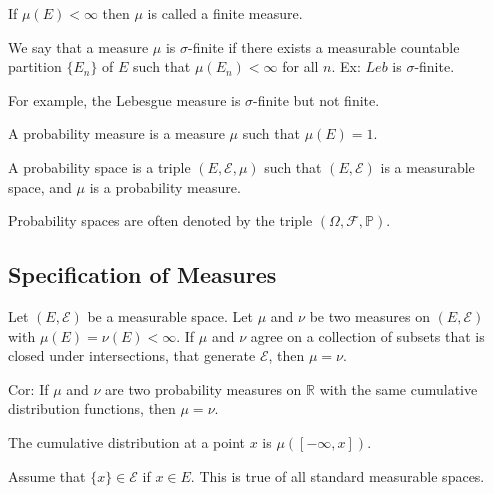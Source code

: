 \documentclass[12pt, titlepage]{article}
\begin{document}
\begin{dfn}{}
	If $\mu(E) < \infty$ then $\mu$ is called a finite measure.
\end{dfn}

\begin{dfn}{}
We say that a measure $\mu$ is $\sigma$-finite if there exists a measurable countable partition $\{E_n\}$ of $E$ such that $\mu(E_n) < \infty$ for all $n$. Ex: $Leb$ is $\sigma$-finite.
\end{dfn}

For example, the Lebesgue measure is $\sigma$-finite but not finite.

\begin{dfn}{}
	A probability measure is a measure $\mu$ such that $\mu(E) = 1$.
\end{dfn}

\begin{dfn}{}
	A probability space is a triple $(E, \mathcal{E}, \mu)$ such that $(E, \mathcal{E})$ is a measurable space, and $\mu$ is a probability measure.
\end{dfn}

Probability spaces are often denoted by the triple $(\Omega, \mathcal{F}, \mathbb{P})$.

\subsection{Specification of Measures}

\begin{theo}{}
	Let $(E, \mathcal{E})$ be a measurable space. Let $\mu$ and $\nu$ be two measures on $(E, \mathcal{E})$ with $\mu(E) = \nu(E) < \infty$. If $\mu$ and $\nu$ agree on a collection of subsets that is closed under intersections, that generate $\mathcal{E}$, then $\mu = \nu$.
\end{theo}

\begin{theo}[Corollary]{}
	Cor: If $\mu$ and $\nu$ are two probability measures on $\mathbb{R}$ with the same cumulative distribution functions, then $\mu = \nu$.
\end{theo}

\begin{theo}{}
	The cumulative distribution at a point $x$ is $\mu([-\infty, x])$.
\end{theo}

Assume that $\{x\} \in \mathcal{E}$ if $x \in E$. This is true of all standard measurable spaces.\\
\end{document}
